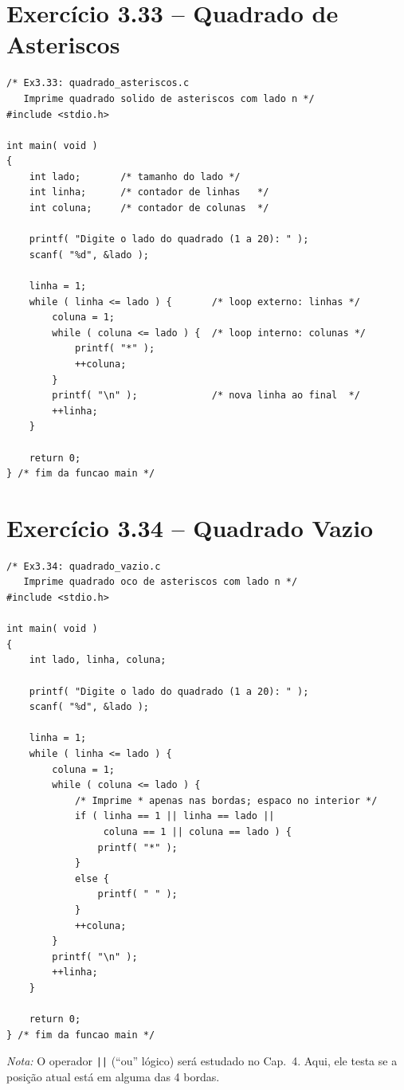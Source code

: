 \documentclass[12pt,a4paper]{article}
\begin{document}
\newpage

\section{Exercício 3.33 -- Quadrado de Asteriscos}

\begin{respostabox}
\begin{lstlisting}
/* Ex3.33: quadrado_asteriscos.c
   Imprime quadrado solido de asteriscos com lado n */
#include <stdio.h>

int main( void )
{
    int lado;       /* tamanho do lado */
    int linha;      /* contador de linhas   */
    int coluna;     /* contador de colunas  */

    printf( "Digite o lado do quadrado (1 a 20): " );
    scanf( "%d", &lado );

    linha = 1;
    while ( linha <= lado ) {       /* loop externo: linhas */
        coluna = 1;
        while ( coluna <= lado ) {  /* loop interno: colunas */
            printf( "*" );
            ++coluna;
        }
        printf( "\n" );             /* nova linha ao final  */
        ++linha;
    }

    return 0;
} /* fim da funcao main */
\end{lstlisting}
\end{respostabox}

\section{Exercício 3.34 -- Quadrado Vazio}

\begin{respostabox}
\begin{lstlisting}
/* Ex3.34: quadrado_vazio.c
   Imprime quadrado oco de asteriscos com lado n */
#include <stdio.h>

int main( void )
{
    int lado, linha, coluna;

    printf( "Digite o lado do quadrado (1 a 20): " );
    scanf( "%d", &lado );

    linha = 1;
    while ( linha <= lado ) {
        coluna = 1;
        while ( coluna <= lado ) {
            /* Imprime * apenas nas bordas; espaco no interior */
            if ( linha == 1 || linha == lado ||
                 coluna == 1 || coluna == lado ) {
                printf( "*" );
            }
            else {
                printf( " " );
            }
            ++coluna;
        }
        printf( "\n" );
        ++linha;
    }

    return 0;
} /* fim da funcao main */
\end{lstlisting}

\textit{Nota:} O operador \texttt{||} (``ou'' lógico) será estudado no Cap.~4.
Aqui, ele testa se a posição atual está em alguma das 4 bordas.
\end{respostabox}
\end{document}
